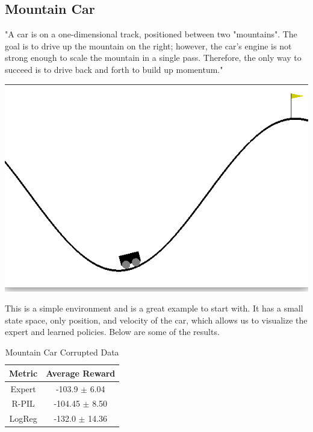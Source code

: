 \documentclass[11pt]{article}
\begin{document}
 \subsection{Mountain Car}
 
\quad "A car is on a one-dimensional track, positioned between two "mountains". The goal is to drive up the mountain on the right; however, the car's engine is not strong enough to scale the mountain in a single pass. Therefore, the only way to succeed is to drive back and forth to build up momentum."\cite{brockman2016openai}
\begin{center}
    \includegraphics[scale=0.5]{MoutainCar.png}
\end{center}

This is a simple environment and is a great example to start with. It has a small state space, only position, and velocity of the car, which allows us to visualize the expert and learned policies. Below are some of the results.

\begin{table}[H]
\caption{Mountain Car Corrupted Data} %
\centering %
    \begin{tabular}{c c} %
        \hline\hline %
        Metric &  Average Reward \\ [0.5ex] %
        \hline %
         Expert &  -103.9 $\pm$ 6.04
         \\ %
        R-PIL & -104.45 $\pm$ 8.50   \\ %
       LogReg & -132.0 $\pm$ 14.36\\
        \hline %
    \end{tabular}
\label{MountainCarCorrupted} %
\end{table}
\end{document}
